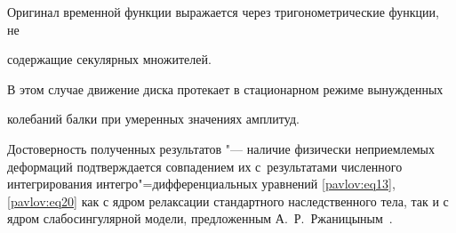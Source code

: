 Оригинал временной функции выражается через тригонометрические функции, не

содержащие секулярных множителей.



В этом случае движение диска протекает в стационарном режиме вынужденных

колебаний балки при умеренных значениях амплитуд.



Достоверность полученных результатов "--- наличие физически неприемлемых деформаций подтверждается совпадением их с~результатами численного интегрирования интегро"=дифференциальных уравнений \eqref{pavlov:eq13}, \eqref{pavlov:eq20} как с ядром релаксации стандартного наследственного тела, так и с ядром слабосингулярной модели, предложенным А.~Р.~Ржаницыным~\cite{pavlov:bib3}.



